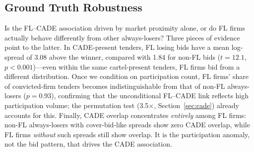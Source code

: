 
\subsection{Ground Truth Robustness}
\label{sec:ground_truth}

Is the FL--CADE association driven by market proximity alone, or do FL
firms actually behave differently from other always-losers? Three pieces
of evidence point to the latter. In CADE-present tenders, FL losing
bids have a mean log-spread of 3.08 above the winner, compared with
1.84 for non-FL bids ($t = 12.1$, $p < 0.001$)---even within the same
cartel-present tenders, FL firms bid from a different distribution.
Once we condition on participation count, FL firms' share of
convicted-firm tenders becomes indistinguishable from that of non-FL
always-losers ($p = 0.93$), confirming that the unconditional FL--CADE
link reflects high participation volume; the permutation test
(3.5$\times$, Section~\ref{sec:cade}) already accounts for this.
Finally, CADE overlap concentrates \emph{entirely} among FL firms:
non-FL always-losers with cover-bid-like spreads show zero CADE
overlap, while FL firms \emph{without} such spreads still show \valDataPilot
overlap. It is the participation anomaly, not the bid pattern, that
drives the CADE association.
